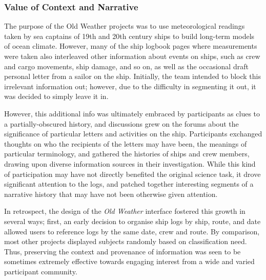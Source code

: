 \documentclass{sigchi}
\begin{document}

\subsubsection{Value of Context and Narrative}

The purpose of the Old Weather projects was to use meteorological readings taken by sea captains of 19th and 20th century ships to build long-term models of ocean climate. However, many of the ship logbook pages where measurements were taken also interleaved other information about events on ships, such as crew and cargo movements, ship damage, and so on, as well as the occasional draft personal letter from a sailor on the ship.  Initially, the team intended to block this irrelevant information out; however, due to the difficulty in segmenting it out, it was decided to simply leave it in. 

However, this additional info was ultimately embraced by participants as clues to a partially-obscured history, and discussions grew on the forums about the significance of particular letters and activities on the ship.  Participants exchanged thoughts on who the recipients of the letters may have been, the meanings of particular terminology, and gathered the histories of ships and crew members, drawing upon diverse information sources in their investigation. While this kind of participation may have not directly benefited the original science task, it drove significant attention to the logs, and patched together interesting segments of a narrative history that may have not been otherwise given attention.  %

In retrospect, the design of the \emph{Old Weather} interface fostered this growth in several ways; first, an early decision to organise ship logs by ship, route, and date allowed users to reference logs by the same date, crew and route. By comparison, most other projects displayed subjects randomly based on classification need. Thus, preserving the context and provenance of information was seen to be sometimes extremely effective towards engaging interest from a wide and varied participant community.
\end{document}
